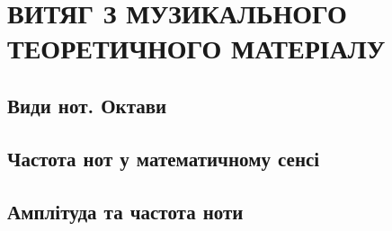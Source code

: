 \section{ВИТЯГ З МУЗИКАЛЬНОГО ТЕОРЕТИЧНОГО МАТЕРІАЛУ}

\subsection{Види нот. Октави}

\lipsum[1]

\subsection{Частота нот у математичному сенсі}

\lipsum[1]

\subsection{Амплітуда та частота ноти}

\lipsum[1]